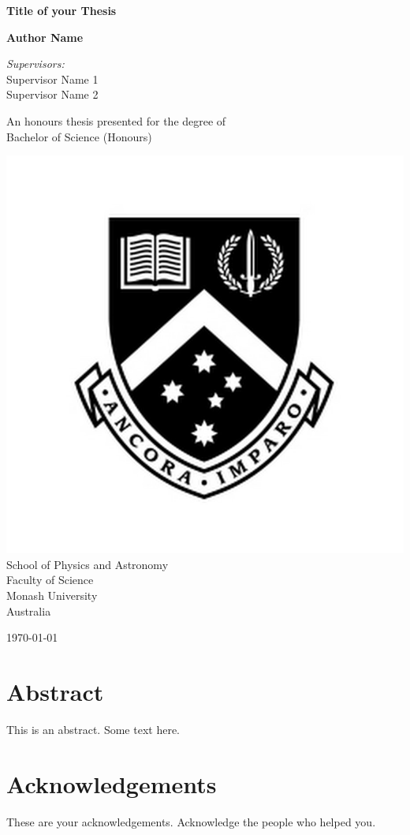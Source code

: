 \documentclass[11pt,a4paper,onecolumn]{report}
\begin{document}
	
	\begin{titlepage}
		\begin{center}
			\vspace*{2cm}
			\Huge
			\textbf{Title of your Thesis}
			
			\vspace{2cm}
			\LARGE
			\textbf{Author Name}
			
			\vspace{0.8cm}
			\Large
			\textit{Supervisors:}\\
			Supervisor Name 1\\
			Supervisor Name 2
			
			\vfill
			\large
			An honours thesis presented for the degree of\\
			Bachelor of Science (Honours)
			
			\vspace{0.3cm}
			\includegraphics[width=0.2\linewidth]{"Monash_Logo"}\\
			School of Physics and Astronomy\\
			Faculty of Science\\
			Monash University\\
			Australia
			
			\vspace{0.5cm}
			
			\today
			
		\end{center}
	\end{titlepage}

\chapter*{Abstract}

This is an abstract. Some text here.

\chapter*{Acknowledgements}

These are your acknowledgements. Acknowledge the people who helped you.
\end{document}
